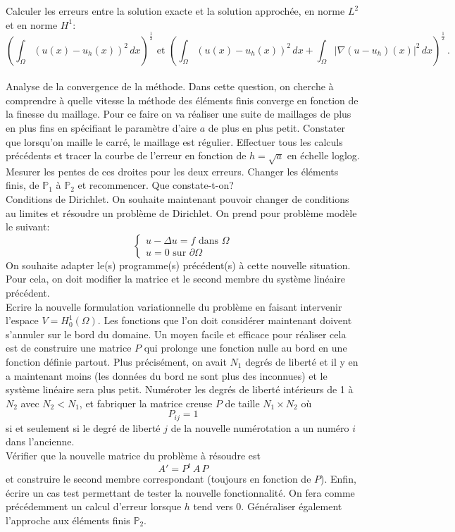 \documentclass[a4paper,french,sumlimits,12pt]{article}
\begin{document}
 Calculer les erreurs entre la solution exacte et la solution approchée, en norme $L^2$ et en norme $H^1$:
$$
\left(\int_\Omega (u(x)-u_h(x))^2\,dx\right)^\frac12\mbox{ et }\left(\int_\Omega (u(x)-u_h(x))^2\,dx+ \int_\Omega |\nabla(u-u_h)(x)|^2\,dx\right)^\frac12 \,.
$$
\\

 Analyse de la convergence de la méthode. Dans cette question, on cherche à comprendre à quelle vitesse la méthode des éléments finis converge en fonction de la finesse du maillage. Pour ce faire on va réaliser une suite de maillages de plus en plus fins en spécifiant le paramètre d'aire $a$ de plus en plus petit. Constater que lorsqu'on maille le carré, le maillage est régulier. Effectuer tous les calculs précédents et tracer la courbe de l'erreur en fonction de $h=\sqrt{a}$ en échelle loglog. Mesurer les pentes de ces droites pour les deux erreurs. Changer les éléments finis, de $\mathbb{P}_1$ à $\mathbb{P}_2$ et recommencer. Que constate-t-on?\\

 Conditions de Dirichlet. On souhaite maintenant pouvoir changer de conditions au limites et résoudre un problème de Dirichlet. On prend pour problème modèle le suivant:
\begin{equation}
\left\{
\begin{array}{l}
u-\Delta u = f \mbox{ dans } \Omega\\
u = 0\mbox{ sur }\partial \Omega
\end{array}
\right.
\label{pbmodele2}
\end{equation}
On souhaite adapter le(s) programme(s) précédent(s) à cette nouvelle situation. Pour cela, on doit modifier la matrice et le second membre du système linéaire précédent. \\
Ecrire la nouvelle formulation variationnelle du problème en faisant intervenir l'espace $V=H^1_0(\Omega)$. Les fonctions que l'on doit considérer maintenant doivent s'annuler sur le bord du domaine. Un moyen facile et efficace pour réaliser cela est de construire une matrice $P$ qui prolonge une fonction nulle au bord en une fonction définie partout. Plus précisément, on avait $N_1$ degrés de liberté et il y en a maintenant moins (les données du bord ne sont plus des inconnues) et le système linéaire sera plus petit. Numéroter les degrés de liberté intérieurs de 1 à $N_2$ avec $N_2<N_1$, et fabriquer la matrice creuse $P$ de taille $N_1\times N_2$ où
$$
P_{ij} = 1
$$
si et seulement si le degré de liberté $j$ de la nouvelle numérotation a un numéro $i$ dans l'ancienne.\\
Vérifier que la nouvelle matrice du problème à résoudre est 
$$
A' = P^t\,A\,P
$$
et construire le second membre correspondant (toujours en fonction de $P$).
Enfin, écrire un cas test permettant de tester la nouvelle fonctionnalité. On fera comme précédemment un calcul d'erreur lorsque $h$ tend vers 0. Généraliser également l'approche aux éléments finis $\mathbb{P}_2$.








 
\end{document}
